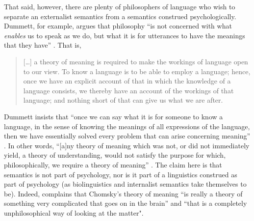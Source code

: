 That said, however, there are plenty of philosophers of language who wish to separate an externalist semantics from a semantics construed psychologically. Dummett, for example, argues that philosophy “is not concerned with what \textit{enables} us to speak as we do, but what it is for utterances to have the meanings that they have” \citep[187--188, emphasis in original]{Dummett1994}. That is,
\begin{quote}
[…] a theory of meaning is required to make the workings of language open to our view. To know a language is to be able to employ a language; hence, once we have an explicit account of that in which the knowledge of a language consists, we thereby have an account of the workings of that language; and nothing short of that can give us what we are after. \citep[4]{Dummett1993}
\end{quote}
Dummett insists that “once we can say what it is for someone to know a language, in the sense of knowing the meanings of all expressions of the language, then we have essentially solved every problem that can arise concerning meaning” \citep[4]{Dummett1993}. In other words, “[a]ny theory of meaning which was not, or did not immediately yield, a theory of understanding, would not satisfy the purpose for which, philosophically, we require a theory of meaning” \citep[4]{Dummett1993}. The claim here is that semantics is not part of psychology, nor is it part of a linguistics construed as part of psychology (as biolinguistics and internalist semantics take themselves to be). Indeed, \citet[187]{Dummett1994} complains that Chomsky’s theory of meaning “is really a theory of something very complicated that goes on in the brain” and “that is a completely unphilosophical way of looking at the matter". 

